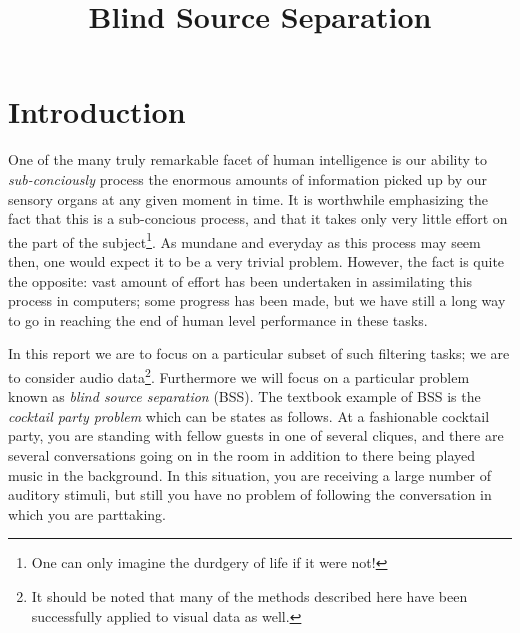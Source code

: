 \documentclass[11pt, oneside, a4paper]{report}
\begin{document}

\title{Blind Source Separation}
\author{}
\date{}    %
\maketitle

\begin{abstract}

\end{abstract}

\tableofcontents
\listoffigures

\chapter{Introduction}

One of the many truly remarkable facet of human intelligence is our
ability to \emph{sub-conciously} process the enormous amounts
of information picked up by our sensory organs at any given moment in
time. It is worthwhile emphasizing the fact that this is a
sub-concious process, and that it takes only very little effort on the
part of the subject\footnote{One can only imagine the durdgery of life
if it were not!}. As mundane and everyday as this process may seem
then, one would expect it to be a very trivial problem. However, the
fact is quite the opposite: vast amount of effort has been undertaken in assimilating this process in
computers; some progress has been made, but we have still a long way
to go in reaching the end of human level performance in these tasks.

In this report we are to focus on a particular subset of such
filtering tasks; we are to consider audio data\footnote{It should be
 noted that many of the methods described here have been successfully
applied to visual data as well.}. Furthermore we will focus on a
particular problem known as \emph{blind source separation} (BSS). The
textbook example of BSS is the \emph{cocktail party problem} which can
be states as follows. At a fashionable cocktail party, you are
standing with fellow guests in one of several cliques, and there are
several conversations going on in the room in addition to there being
played music in the background. In this situation, you are receiving a
large number of auditory stimuli, but still you have no problem of
following the conversation in which you are parttaking. 
\end{document}
